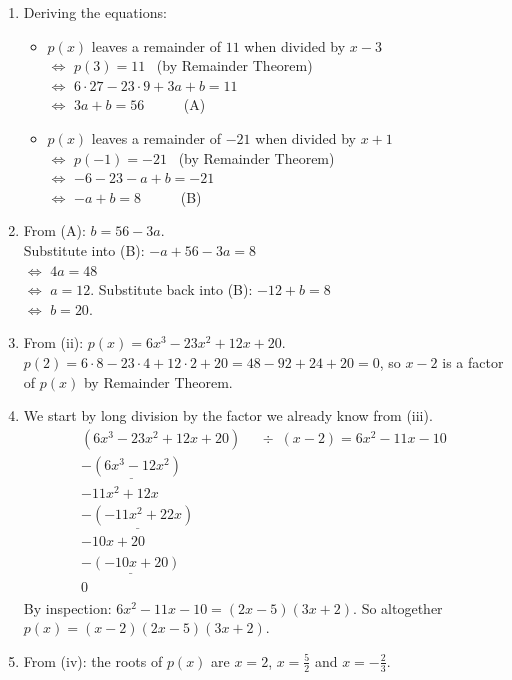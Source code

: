\documentclass[
  12pt,
  oneside]{book}
\providecommand{\tightlist}{%
  \setlength{\itemsep}{0pt}\setlength{\parskip}{0pt}}
\theoremstyle{definition}
\theoremstyle{definition}
\theoremstyle{definition}
\theoremstyle{definition}
\theoremstyle{remark}
\begin{document}
\begin{enumerate}
\def\labelenumi{(\roman{enumi})}
\item
  Deriving the equations:

  \begin{itemize}
  \tightlist
  \item
    \(p(x)\) leaves a remainder of \(11\) when divided by \(x-3\)\\
    \(\iff\) \(p(3)=11\) \hfill~{(by Remainder Theorem)}\\
    \(\iff\) \(6\cdot 27-23\cdot 9+3a+b = 11\)\\
    \(\iff\) \(3a+b=56\) ~ ~ ~ (A)
  \item
    \(p(x)\) leaves a remainder of \(-21\) when divided by \(x+1\)\\
    \(\iff\) \(p(-1)=-21\) \hfill~{(by Remainder Theorem)}\\
    \(\iff\) \(-6-23-a+b=-21\)\\
    \(\iff\) \(-a+b=8\) ~ ~ ~ (B)
  \end{itemize}
\item
  From (A): \(b=56-3a\).\\
  Substitute into (B): \(-a+56-3a = 8\)\\
  \(\iff\) \(4a=48\)\\
  \(\iff\) \(a=12\).
  Substitute back into (B): \(-12+b=8\)\\
  \(\iff\) \(b=20\).
\item
  From (ii): \(p(x)=6x^3-23x^2+12x+20\).\\
  \(p(2)=6\cdot8 - 23\cdot 4+12\cdot2+20=48-92+24+20=0\), so \(x-2\) is a factor of \(p(x)\) by Remainder Theorem.
\item
  We start by long division by the factor we already know from (iii).
  \[
  \begin{array}{rl}
  (6x^3-23x^2+12x+20) &\div\,\,\,(x-2) = 6x^2-11x-10\\
  \underline{-(6x^3-12x^2)}\phantom{+12x+20)}\\
  -11x^2+12x\phantom{+20m}\\
  \underline{-(-11x^2+22x)}\phantom{+20)}\\
  -10x+20\phantom{)}\\
  \underline{-(-10x+20)}\\
  0\phantom{)}
  \end{array}
  \]
  By inspection: \(6x^2-11x-10=(2x-5)(3x+2)\).
  So altogether \(p(x)=(x-2)(2x-5)(3x+2)\).
\item
  From (iv): the roots of \(p(x)\) are \(x=2\), \(x=\frac{5}{2}\) and \(x=-\frac{2}{3}\).
\end{enumerate}
\end{document}
